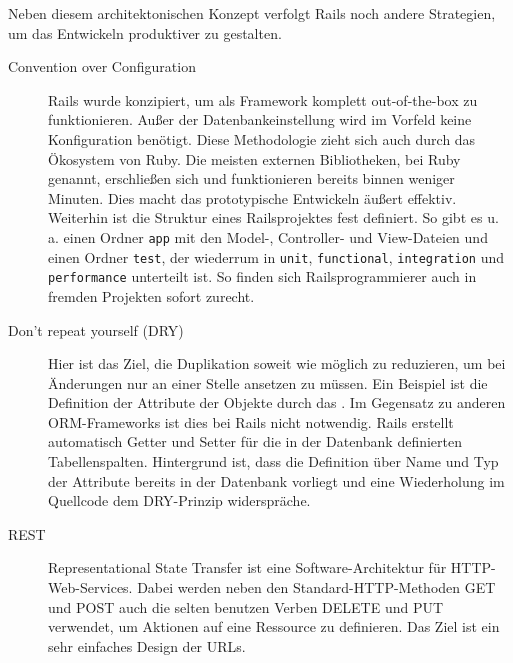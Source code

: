 Neben diesem architektonischen Konzept verfolgt Rails noch andere Strategien, um das Entwickeln produktiver zu gestalten.
\begin{description}
 \item[Convention over Configuration] Rails wurde konzipiert, um als Framework komplett out-of-the-box zu funktionieren. Außer der Datenbankeinstellung wird im Vorfeld keine Konfiguration benötigt. Diese Methodologie zieht sich auch durch das Ökosystem von Ruby. Die meisten externen Bibliotheken, bei Ruby  genannt, erschließen sich und funktionieren bereits binnen weniger Minuten. Dies macht das prototypische Entwickeln äußert effektiv. Weiterhin ist die Struktur eines Railsprojektes fest definiert. So gibt es u. a. einen Ordner \texttt{app} mit den Model-, Controller- und View-Dateien und einen Ordner \texttt{test}, der wiederrum in \texttt{unit}, \texttt{functional}, \texttt{integration} und \texttt{performance} unterteilt ist. So finden sich Railsprogrammierer auch in fremden Projekten sofort zurecht.
 \item[Don't repeat yourself (DRY)] Hier ist das Ziel, die Duplikation soweit wie möglich zu reduzieren, um bei Änderungen nur an einer Stelle ansetzen zu müssen. Ein Beispiel ist die Definition der Attribute der Objekte durch das . Im Gegensatz zu anderen ORM-Frameworks ist dies bei Rails nicht notwendig. Rails erstellt automatisch Getter und Setter für die in der Datenbank definierten Tabellenspalten. Hintergrund ist, dass die Definition über Name und Typ der Attribute bereits in der Datenbank vorliegt und eine Wiederholung im Quellcode dem DRY-Prinzip widerspräche.
 \item[REST] Representational State Transfer ist eine Software-Architektur für HTTP-Web-Services. Dabei werden neben den Standard-HTTP-Methoden GET und POST auch die selten benutzen Verben DELETE und PUT verwendet, um Aktionen auf eine Ressource zu definieren. Das Ziel ist ein sehr einfaches Design der URLs.


\end{description}
